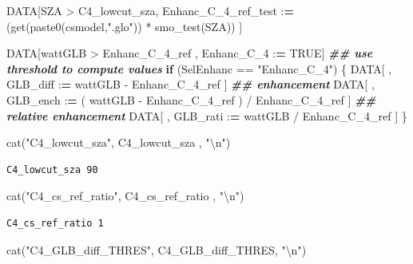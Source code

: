 \documentclass[
  10pt,
  a4paper,oneside]{article}
\newenvironment{Shaded}{\begin{snugshade}}{\end{snugshade}}
\newcommand{\ConstantTok}[1]{\textcolor[rgb]{0.00,0.00,0.00}{#1}}
\newcommand{\ControlFlowTok}[1]{\textcolor[rgb]{0.13,0.29,0.53}{\textbf{#1}}}
\newcommand{\DocumentationTok}[1]{\textcolor[rgb]{0.56,0.35,0.01}{\textbf{\textit{#1}}}}
\newcommand{\ErrorTok}[1]{\textcolor[rgb]{0.64,0.00,0.00}{\textbf{#1}}}
\newcommand{\FunctionTok}[1]{\textcolor[rgb]{0.00,0.00,0.00}{#1}}
\newcommand{\NormalTok}[1]{#1}
\newcommand{\SpecialCharTok}[1]{\textcolor[rgb]{0.00,0.00,0.00}{#1}}
\newcommand{\StringTok}[1]{\textcolor[rgb]{0.31,0.60,0.02}{#1}}
\begin{document}
\begin{Shaded}
\begin{Highlighting}[]
\NormalTok{DATA[SZA }\SpecialCharTok{\textgreater{}}\NormalTok{ C4\_lowcut\_sza,}
\NormalTok{     Enhanc\_C\_4\_ref\_test }\SpecialCharTok{:}\ErrorTok{=}\NormalTok{                                    (}\FunctionTok{get}\NormalTok{(}\FunctionTok{paste0}\NormalTok{(csmodel,}\StringTok{".glo"}\NormalTok{)) }\SpecialCharTok{*} \FunctionTok{smo\_test}\NormalTok{(SZA)) ]}



\NormalTok{DATA[wattGLB }\SpecialCharTok{\textgreater{}}\NormalTok{ Enhanc\_C\_4\_ref ,}
\NormalTok{     Enhanc\_C\_4 }\SpecialCharTok{:}\ErrorTok{=} \ConstantTok{TRUE}\NormalTok{]}
\DocumentationTok{\#\# use threshold to compute values}
\ControlFlowTok{if}\NormalTok{ (SelEnhanc }\SpecialCharTok{==} \StringTok{"Enhanc\_C\_4"}\NormalTok{) \{}
\NormalTok{  DATA[ , GLB\_diff }\SpecialCharTok{:}\ErrorTok{=}\NormalTok{   wattGLB }\SpecialCharTok{{-}}\NormalTok{ Enhanc\_C\_4\_ref                    ] }\DocumentationTok{\#\# enhancement}
\NormalTok{  DATA[ , GLB\_ench }\SpecialCharTok{:}\ErrorTok{=}\NormalTok{ ( wattGLB }\SpecialCharTok{{-}}\NormalTok{ Enhanc\_C\_4\_ref ) }\SpecialCharTok{/}\NormalTok{ Enhanc\_C\_4\_ref ] }\DocumentationTok{\#\# relative enhancement}
\NormalTok{  DATA[ , GLB\_rati }\SpecialCharTok{:}\ErrorTok{=}\NormalTok{   wattGLB }\SpecialCharTok{/}\NormalTok{ Enhanc\_C\_4\_ref                    ]}
\NormalTok{\}}

\FunctionTok{cat}\NormalTok{(}\StringTok{"C4\_lowcut\_sza"}\NormalTok{,      C4\_lowcut\_sza    , }\StringTok{"}\SpecialCharTok{\textbackslash{}n}\StringTok{"}\NormalTok{)}
\end{Highlighting}
\end{Shaded}

\begin{verbatim}
C4_lowcut_sza 90 
\end{verbatim}

\begin{Shaded}
\begin{Highlighting}[]
\FunctionTok{cat}\NormalTok{(}\StringTok{"C4\_cs\_ref\_ratio"}\NormalTok{,    C4\_cs\_ref\_ratio  , }\StringTok{"}\SpecialCharTok{\textbackslash{}n}\StringTok{"}\NormalTok{)}
\end{Highlighting}
\end{Shaded}

\begin{verbatim}
C4_cs_ref_ratio 1 
\end{verbatim}

\begin{Shaded}
\begin{Highlighting}[]
\FunctionTok{cat}\NormalTok{(}\StringTok{"C4\_GLB\_diff\_THRES"}\NormalTok{,  C4\_GLB\_diff\_THRES, }\StringTok{"}\SpecialCharTok{\textbackslash{}n}\StringTok{"}\NormalTok{)}
\end{Highlighting}
\end{Shaded}
\end{document}
